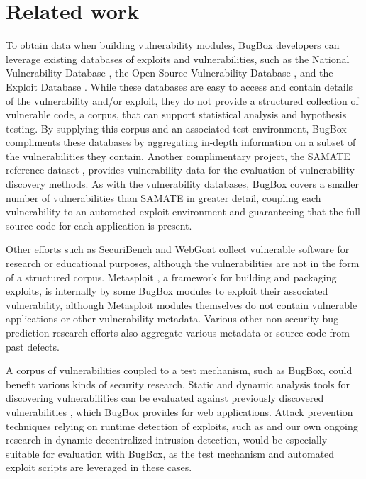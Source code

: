 \documentclass[letterpaper,twocolumn,10pt]{article}
\begin{document}
\section{Related work}
To obtain data when building vulnerability modules, BugBox developers can leverage existing databases of exploits and vulnerabilities, such as the National Vulnerability Database \cite{NVD}, the Open Source Vulnerability Database \cite{OSVDB}, and the Exploit Database \cite{exploitdb}. While these databases are easy to access and contain details of the vulnerability and/or exploit, they do not provide a structured collection of vulnerable code, a corpus, that can support statistical analysis and hypothesis testing. By supplying this corpus and an associated test environment, BugBox compliments these databases by aggregating in-depth information on a subset of the vulnerabilities they contain. Another complimentary project, the SAMATE reference dataset \cite{SAMATE}, provides vulnerability data for the evaluation of vulnerability discovery methods. As with the vulnerability databases, BugBox covers a smaller number of vulnerabilities than SAMATE in greater detail, coupling each vulnerability to an automated exploit environment and guaranteeing that the full source code for each application is present.

Other efforts such as SecuriBench \cite{livshits2005defining} and WebGoat \cite{webgoat} collect vulnerable software for research or educational purposes, although the vulnerabilities are not in the form of a structured corpus. Metasploit \cite{metasploit}, a framework for building and packaging exploits, is internally by some BugBox modules to exploit their associated vulnerability, although Metasploit modules themselves do not contain vulnerable applications or other vulnerability metadata. Various other non-security bug prediction research efforts \cite{defectcorpus,eclipsebugdata} also aggregate various metadata or source code from past defects.

A corpus of vulnerabilities coupled to a test mechanism, such as BugBox, could benefit various kinds of security research. Static and dynamic analysis tools for discovering vulnerabilities \cite{onetechnique,antunes2009comparing} can be evaluated against previously discovered vulnerabilities \cite{bufferoverflowbenchmark}, which BugBox provides for web applications. Attack prevention techniques relying on runtime detection of exploits, such as \cite{commandinjection} and our own ongoing research in dynamic decentralized intrusion detection, would be especially suitable for evaluation with BugBox, as the test mechanism and automated exploit scripts are leveraged in these cases.
\end{document}
